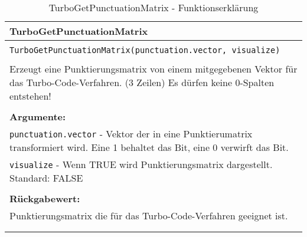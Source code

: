 \begin{longtable}{|p{\textwidth}|}
\hline
\rowcolor{lightblue}TurboGetPunctuationMatrix\\
\hline
\\
\texttt{TurboGetPunctuationMatrix(punctuation.vector, visualize)}\\
\\
Erzeugt eine Punktierungsmatrix von einem mitgegebenen Vektor für das Turbo-Code-Verfahren. (3 Zeilen) Es dürfen keine 0-Spalten entstehen!\\
\\
\textbf{Argumente:}\\
\texttt{punctuation.vector} - Vektor der in eine Punktierumatrix transformiert wird. Eine 1 behaltet das Bit, eine 0 verwirft das Bit.\\
\texttt{visualize} - Wenn TRUE wird Punktierungsmatrix dargestellt. Standard: FALSE\\
\\
\textbf{Rückgabewert:}\\
Punktierungsmatrix die für das Turbo-Code-Verfahren geeignet ist.\\
\\
\hline
\caption{TurboGetPunctuationMatrix - Funktionserklärung}
\end{longtable}